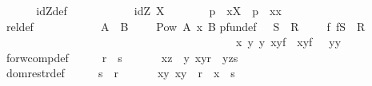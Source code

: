 \begin{isabellebody}
\isanewline
\ \ \isanewline
{}\isamarkupfalse%
\isanewline
\ \ \isanewline
idZ{\isacharunderscore}def{\isacharcolon}\ \ \ \ \ \ \ \ \ \ \ \ {\isachardoublequoteopen}idZ\ X\ \ \ \ \ \ \ {\isacharequal}{\isacharequal}\ {\isacharbraceleft}p{\isachardot}\ {\isacharquery}\ x{\isacharcolon}X\ {\isachardot}\ p\ {\isacharequal}\ {\isacharparenleft}x{\isacharcomma}x{\isacharparenright}{\isacharbraceright}{\isachardoublequoteclose}\isanewline
rel{\isacharunderscore}def{\isacharcolon}\ \ \ \ \ \ \ \ \ \ \ \ {\isachardoublequoteopen}A\ {\isacharless}{\isacharminus}{\isacharminus}{\isachargreater}\ B\ \ \ \ {\isacharequal}{\isacharequal}\ Pow\ {\isacharparenleft}A\ {\isacharpercent}x\ B{\isacharparenright}{\isachardoublequoteclose}\isanewline
pfun{\isacharunderscore}def{\isacharcolon}\ \ \ {\isachardoublequoteopen}S\ {\isacharminus}{\isacharbar}{\isacharminus}{\isachargreater}\ R\ \ \ \ {\isacharequal}{\isacharequal}\ {\isacharbraceleft}f{\isachardot}\ f{\isacharcolon}{\isacharparenleft}S\ {\isacharless}{\isacharminus}{\isacharminus}{\isachargreater}\ R{\isacharparenright}\isanewline
\ \ \ \ \ \ \ \ \ \ \ \ \ \ \ \ \ \ \ \ \ \ \ \ \ \ \ \ \ \ \ \ \ \ \ \ \ \ \ {\isacharampersand}\ {\isacharparenleft}{\isacharbang}\ x\ y{}\ y{}{\isachardot}\ {\isacharparenleft}x{\isacharcomma}y{}{\isacharparenright}{\isacharcolon}f\ {\isacharampersand}\ {\isacharparenleft}x{\isacharcomma}y{}{\isacharparenright}{\isacharcolon}f\ \ {\isacharminus}{\isacharminus}{\isachargreater}\ {\isacharparenleft}y{}{\isacharequal}y{}{\isacharparenright}{\isacharparenright}{\isacharbraceright}{\isachardoublequoteclose}\isanewline
\isanewline
forw{\isacharunderscore}comp{\isacharunderscore}def{\isacharcolon}\ \ \ \ \ \ {\isachardoublequoteopen}r\ {\isacharpercent}{\isacharsemicolon}\ s\ \ \ \ \ \ {\isacharequal}{\isacharequal}\ {\isacharbraceleft}{\isacharparenleft}x{\isacharcomma}z{\isacharparenright}{\isachardot}\ {\isacharquery}\ y{\isachardot}\ {\isacharparenleft}x{\isacharcomma}y{\isacharparenright}{\isacharcolon}r\ {\isacharampersand}\ {\isacharparenleft}y{\isacharcomma}z{\isacharparenright}{\isacharcolon}s\ {\isacharbraceright}{\isachardoublequoteclose}\isanewline
dom{\isacharunderscore}restr{\isacharunderscore}def{\isacharcolon}\ \ \ \ \ \ {\isachardoublequoteopen}s\ {\isacharless}{\isacharcolon}\ r\ \ \ \ \ \ {\isacharequal}{\isacharequal}\ {\isacharbraceleft}{\isacharparenleft}x{\isacharcomma}y{\isacharparenright}{\isachardot}\ {\isacharparenleft}x{\isacharcomma}y{\isacharparenright}\ {\isacharcolon}\ r\ {\isacharampersand}\ x\ {\isacharcolon}\ s{\isacharbraceright}{\isachardoublequoteclose}\isanewline

\end{isabellebody}
